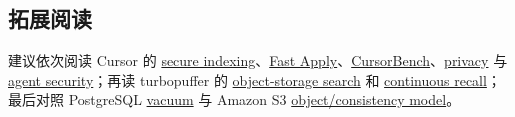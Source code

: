 \documentclass[a4paper]{article}
\begin{document}
\subsection{拓展阅读}

建议依次阅读 Cursor 的 \href{https://cursor.com/blog/secure-codebase-indexing}{secure indexing}、\href{https://cursor.com/blog/instant-apply}{Fast Apply}、\href{https://cursor.com/blog/cursorbench}{CursorBench}、\href{https://cursor.com/docs/enterprise/privacy-and-data-governance}{privacy} 与 \href{https://cursor.com/docs/agent/security}{agent security}；再读 turbopuffer 的 \href{https://turbopuffer.com/blog/turbopuffer}{object-storage search} 和 \href{https://turbopuffer.com/blog/continuous-recall}{continuous recall}；最后对照 PostgreSQL \href{https://www.postgresql.org/docs/current/routine-vacuuming.html}{vacuum} 与 Amazon S3 \href{https://docs.aws.amazon.com/AmazonS3/latest/userguide/Welcome.html}{object/consistency model}。
\end{document}
